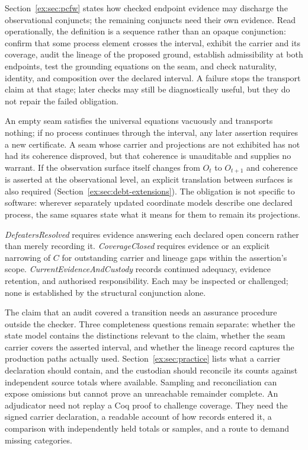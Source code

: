 \documentclass[smallextended,envcountsect,envcountsame,natbib]{svjour3}
\begin{document}
Section~\ref{ex:sec:pcfw} states how checked endpoint evidence may discharge the observational conjuncts; the remaining conjuncts need their own evidence. Read operationally, the definition is a sequence rather than an opaque conjunction: confirm that some process element crosses the interval, exhibit the carrier and its coverage, audit the lineage of the proposed ground, establish admissibility at both endpoints, test the grounding equations on the seam, and check naturality, identity, and composition over the declared interval. A failure stops the transport claim at that stage; later checks may still be diagnostically useful, but they do not repair the failed obligation.

An empty seam satisfies the universal equations vacuously and transports nothing; if no process continues through the interval, any later assertion requires a new certificate. A seam whose carrier and projections are not exhibited has not had its coherence disproved, but that coherence is unauditable and supplies no warrant. If the observation surface itself changes from $O_t$ to $O_{t+1}$ and coherence is asserted at the observational level, an explicit translation between surfaces is also required (Section~\ref{ex:sec:debt-extensions}). The obligation is not specific to software: wherever separately updated coordinate models describe one declared process, the same squares state what it means for them to remain its projections.

\emph{DefeatersResolved} requires evidence answering each declared open concern rather than merely recording it. \emph{CoverageClosed} requires evidence or an explicit narrowing of $C$ for outstanding carrier and lineage gaps within the assertion's scope. \emph{CurrentEvidenceAndCustody} records continued adequacy, evidence retention, and authorised responsibility. Each may be inspected or challenged; none is established by the structural conjunction alone.

The claim that an audit covered a transition needs an assurance procedure outside the checker. Three completeness questions remain separate: whether the state model contains the distinctions relevant to the claim, whether the seam carrier covers the asserted interval, and whether the lineage record captures the production paths actually used. Section~\ref{ex:sec:practice} lists what a carrier declaration should contain, and the custodian should reconcile its counts against independent source totals where available. Sampling and reconciliation can expose omissions but cannot prove an unreachable remainder complete. An adjudicator need not replay a Coq proof to challenge coverage. They need the signed carrier declaration, a readable account of how records entered it, a comparison with independently held totals or samples, and a route to demand missing categories.
\end{document}
